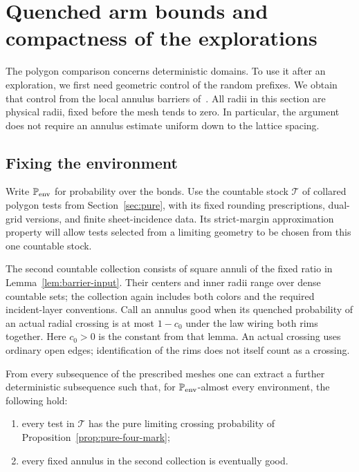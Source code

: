 \section{Quenched arm bounds and compactness of the explorations}
\label{sec:tightness}

The polygon comparison concerns deterministic domains.  To use it after
an exploration, we first need geometric control of the random prefixes.
We obtain that control from the local annulus barriers of~\cite{Q}.
All radii in this section are physical radii, fixed before the mesh
tends to zero.  In particular, the argument does not require an annulus
estimate uniform down to the lattice spacing.

\subsection{Fixing the environment}

Write $\P_{\rm env}$ for probability over the bonds.  Use the
countable stock $\mathscr T$ of collared polygon tests from
Section~\ref{sec:pure}, with its fixed rounding prescriptions,
dual-grid versions, and finite sheet-incidence data.  Its strict-margin
approximation property will allow tests selected from a limiting
geometry to be chosen from this one countable stock.

The second countable collection consists of square annuli of the fixed
ratio in Lemma~\ref{lem:barrier-input}.  Their centers
and inner radii range over dense countable sets; the collection again
includes both colors and the required incident-layer conventions.
Call an annulus good when its quenched probability of an actual radial
crossing is at most $1-c_0$ under the law wiring both rims together.
Here $c_0>0$ is the constant from that lemma.  An actual crossing uses
ordinary open edges; identification of the rims does not itself count
as a crossing.

\begin{lemma}
\label{lem:quenched-diagonal}
From every subsequence of the prescribed meshes one can extract a
further deterministic subsequence such that, for
$\P_{\rm env}$-almost every environment, the following hold:
\begin{enumerate}
\item every test in $\mathscr T$ has the pure limiting crossing
probability of Proposition~\ref{prop:pure-four-mark};
\item every fixed annulus in the second collection is eventually good.
\end{enumerate}
\end{lemma}

